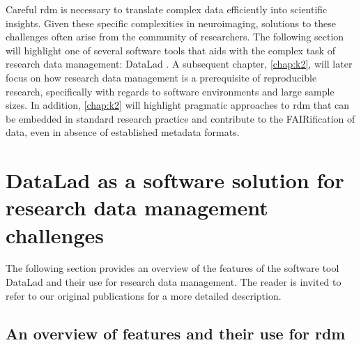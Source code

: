 
Careful \gls{rdm} is necessary to translate complex data efficiently into scientific insights.
Given these specific complexities in neuroimaging, solutions to these challenges often arise from the community of researchers.
The following section will highlight one of several software tools that aids with the complex task of research data management: DataLad \citep{Halchenko2021}.
A subsequent chapter, \cref{chap:k2}, will later focus on how research data management is a prerequisite of reproducible research, specifically with regards to software environments and large sample sizes.
In addition, \cref{chap:k2} will highlight pragmatic approaches to \gls{rdm} that can be embedded in standard research practice and contribute to the FAIRification of data, even in absence of established metadata formats.




\section{DataLad as a software solution for research data management challenges}

The following section provides an overview of the features of the software tool DataLad and their use for research data management.
The reader is invited to refer to our original publications \citep{Halchenko2021} \citep{wagner2020datalad} for a more detailed description.

\subsection{An overview of features and their use for \gls{rdm}}

